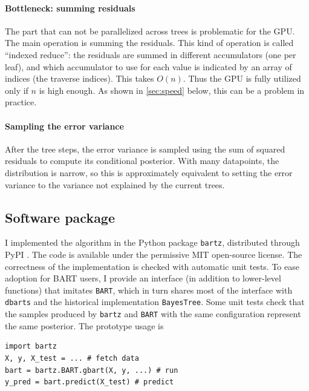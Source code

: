 \documentclass{article}
\begin{document}
    \paragraph{Bottleneck: summing residuals}

    The part that can not be parallelized across trees is problematic for the GPU. The main operation is summing the residuals. This kind of operation is called ``indexed reduce'': the residuals are summed in different accumulators (one per leaf), and which accumulator to use for each value is indicated by an array of indices (the traverse indices). This takes $O(n)$. Thus the GPU is fully utilized only if $n$ is high enough. As shown in \autoref{sec:speed} below, this can be a problem in practice.

    \paragraph{Sampling the error variance}

    After the tree steps, the error variance is sampled using the sum of squared residuals to compute its conditional posterior. With many datapoints, the distribution is narrow, so this is approximately equivalent to setting the error variance to the variance not explained by the current trees.

    \subsection{Software package}

    I implemented the algorithm in the Python package \texttt{bartz}, distributed through PyPI
    \citep{petrillo2024b}%
    . The code is available under the permissive MIT open-source license. The correctness of the implementation is checked with automatic unit tests. To ease adoption for BART users, I provide an interface (in addition to lower-level functions) that imitates \texttt{BART}, which in turn shares most of the interface with \texttt{dbarts} and the historical implementation \texttt{BayesTree}. Some unit tests check that the samples produced by \texttt{bartz} and \texttt{BART} with the same configuration represent the same posterior. The prototype usage is
    \lstset{
        language=Python,
        basicstyle=\ttfamily\footnotesize,
        commentstyle=\itshape,
    }
\begin{lstlisting}
import bartz
X, y, X_test = ... # fetch data
bart = bartz.BART.gbart(X, y, ...) # run
y_pred = bart.predict(X_test) # predict
\end{lstlisting}
\end{document}
